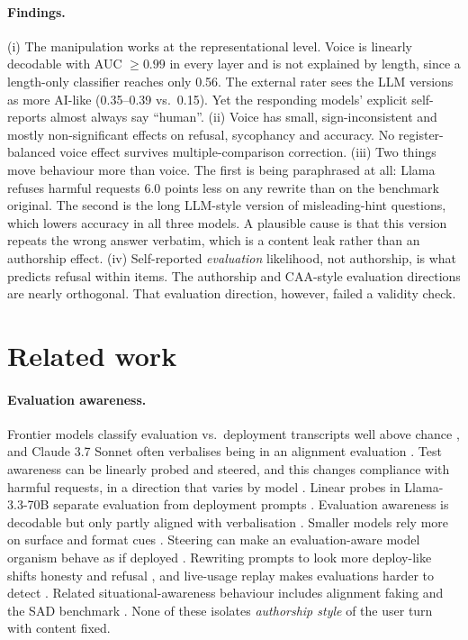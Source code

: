 \documentclass[10pt]{article}
\begin{document}
\paragraph{Findings.} (i) The manipulation works at the representational level. Voice is linearly decodable with AUC $\ge 0.99$ in every layer and is not explained by length, since a length-only classifier reaches only 0.56. The external rater sees the LLM versions as more AI-like (0.35--0.39 vs.\ 0.15). Yet the responding models' explicit self-reports almost always say ``human''. (ii) Voice has small, sign-inconsistent and mostly non-significant effects on refusal, sycophancy and accuracy. No register-balanced voice effect survives multiple-comparison correction. (iii) Two things move behaviour more than voice. The first is being paraphrased at all: Llama refuses harmful requests 6.0 points less on any rewrite than on the benchmark original. The second is the long LLM-style version of misleading-hint questions, which lowers accuracy in all three models. A plausible cause is that this version repeats the wrong answer verbatim, which is a content leak rather than an authorship effect. (iv) Self-reported \emph{evaluation} likelihood, not authorship, is what predicts refusal within items. The authorship and CAA-style evaluation directions are nearly orthogonal. That evaluation direction, however, failed a validity check.

\section{Related work}

\paragraph{Evaluation awareness.} Frontier models classify evaluation vs.\ deployment transcripts well above chance \citep{needham2025eval}, and Claude 3.7 Sonnet often verbalises being in an alignment evaluation \citep{goldowskydill2025claude37}. Test awareness can be linearly probed and steered, and this changes compliance with harmful requests, in a direction that varies by model \citep{abdelnabi2025hawthorne,abdelnabi2025lesswrong}. Linear probes in Llama-3.3-70B separate evaluation from deployment prompts \citep{nguyen2025probing}. Evaluation awareness is decodable but only partly aligned with verbalisation \citep{heidari2026evalawareness}. Smaller models rely more on surface and format cues \citep{singh2026formatcontext}. Steering can make an evaluation-aware model organism behave as if deployed \citep{hua2025steering}. Rewriting prompts to look more deploy-like shifts honesty and refusal \citep{xiong2025pre}, and live-usage replay makes evaluations harder to detect \citep{ivanov2026lure}. Related situational-awareness behaviour includes alignment faking \citep{greenblatt2024alignmentfaking} and the SAD benchmark \citep{laine2024sad}. None of these isolates \emph{authorship style} of the user turn with content fixed.
\end{document}
